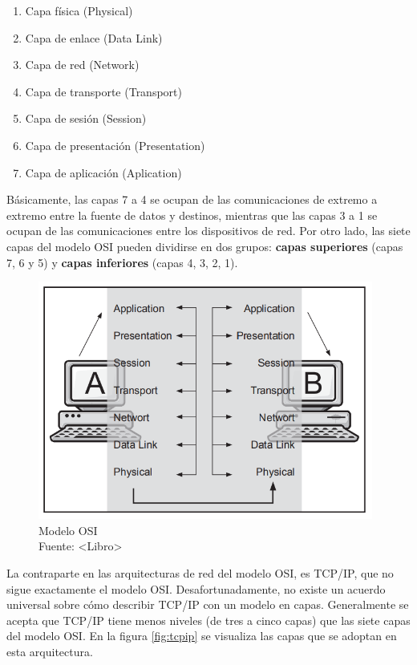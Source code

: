 \begin{enumerate}
    \item Capa física (Physical)
    \item Capa de enlace (Data Link)
    \item Capa de red (Network)
    \item Capa de transporte (Transport)
    \item Capa de sesión (Session)
    \item Capa de presentación (Presentation)
    \item Capa de aplicación (Aplication)
\end{enumerate}

Básicamente, las capas 7 a 4 se ocupan de las comunicaciones de extremo a extremo entre la fuente de datos y destinos, mientras que las capas 3 a 1 se ocupan de las comunicaciones entre los dispositivos de red. Por otro lado, las siete capas del modelo OSI pueden dividirse en dos grupos: \textbf{capas superiores} (capas 7, 6 y 5) y \textbf{capas inferiores} (capas 4, 3, 2, 1).\\

\begin{figure}[H]
    \begin{center}
        \includegraphics[width=11cm]{img/capitulo_2/capas.png}
    \end{center}
    \caption{Modelo OSI\\Fuente: <Libro>}
    \label{fig:osi}
\end{figure}

La contraparte en las arquitecturas de red del modelo OSI, es TCP/IP, que no sigue exactamente el modelo OSI. Desafortunadamente, no existe un acuerdo universal sobre cómo describir TCP/IP con un modelo en capas. Generalmente se acepta que TCP/IP tiene menos niveles (de tres a cinco capas) que las siete capas del modelo OSI. En la figura \ref{fig:tcpip} se visualiza las capas que se adoptan en esta arquitectura. 

